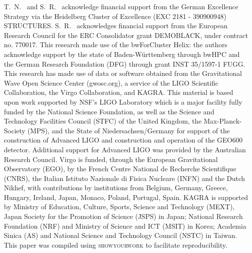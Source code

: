 \documentclass[twocolumn]{aastex631}
\begin{document}
\begin{acknowledgments}
T.~N.~ and S.~R.~ acknowledge financial support from the German Excellence Strategy via the Heidelberg Cluster of Excellence (EXC 2181 - 390900948) STRUCTURES.
S.~R.~ acknowledges financial support from the European Research Council for the ERC Consolidator grant DEMOBLACK, under contract no. 770017. 
This research made use of the bwForCluster Helix: the authors acknowledge support by the state of Baden-Württemberg through bwHPC and the German Research Foundation (DFG) through grant INST 35/1597-1 FUGG.
This research has made use of data or software obtained from the Gravitational Wave Open Science Center (gwosc.org), a service of the LIGO Scientific Collaboration, the Virgo Collaboration, and KAGRA. This material is based upon work supported by NSF's LIGO Laboratory which is a major facility fully funded by the National Science Foundation, as well as the Science and Technology Facilities Council (STFC) of the United Kingdom, the Max-Planck-Society (MPS), and the State of Niedersachsen/Germany for support of the construction of Advanced LIGO and construction and operation of the GEO600 detector. Additional support for Advanced LIGO was provided by the Australian Research Council. Virgo is funded, through the European Gravitational Observatory (EGO), by the French Centre National de Recherche Scientifique (CNRS), the Italian Istituto Nazionale di Fisica Nucleare (INFN) and the Dutch Nikhef, with contributions by institutions from Belgium, Germany, Greece, Hungary, Ireland, Japan, Monaco, Poland, Portugal, Spain. KAGRA is supported by Ministry of Education, Culture, Sports, Science and Technology (MEXT), Japan Society for the Promotion of Science (JSPS) in Japan; National Research Foundation (NRF) and Ministry of Science and ICT (MSIT) in Korea; Academia Sinica (AS) and National Science and Technology Council (NSTC) in Taiwan.
This paper was compiled using \textsc{showyourwork} \cite{Luger2021} to facilitate reproducibility.

\end{acknowledgments}


\end{document}
